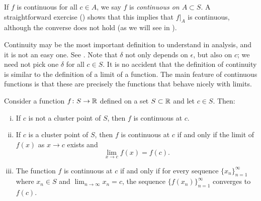 If $f$ is continuous for all $c \in A$, we say
$f$ is \emph{continuous on $A \subset S$}.  A straightforward
exercise ()
shows that this implies that $f|_A$ is continuous, although
the converse does not hold (as we will see in ).

Continuity may be the most important definition to understand in analysis,
and it is not an easy one.  See .
Note that $\delta$ not only
depends on $\epsilon$, but also on $c$;  we need not pick
one $\delta$ for all $c \in S$.
It is no accident 
that the definition of continuity is similar to the definition of a
limit of a function.  The main feature of continuous functions
is that these are precisely the functions that behave nicely with limits.

\begin{prop} \label{contbasic:prop}
Consider a function $f \colon S \to {\mathbb{R}}$ defined on a set  $S \subset {\mathbb{R}}$
and let $c \in S$.
Then:
\begin{enumerate}[(i)]
\item \label{contbasic:prop:i}
If $c$ is not a cluster point of $S$, then $f$ is continuous at $c$.
\item \label{contbasic:prop:ii}
If $c$ is a cluster point of $S$, then $f$ is continuous at $c$
if and only if the limit of $f(x)$ as $x \to c$ exists and
\begin{equation*}
\lim_{x\to c} f(x) = f(c) .
\end{equation*}
\item \label{contbasic:prop:iii}
The function $f$ is continuous at $c$ if and only if for every sequence
$\{ x_n \}_{n=1}^\infty$
where $x_n \in S$ and $\lim_{n\to\infty} x_n = c$, the sequence
$\bigl\{ f(x_n) \bigr\}_{n=1}^\infty$ converges
to $f(c)$.
\end{enumerate}
\end{prop}

